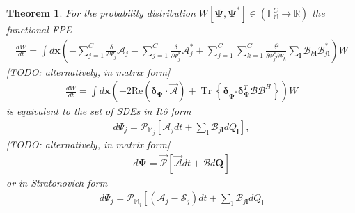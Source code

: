 \documentclass[12pt,aip,jmp,amssymb,amsmath]{revtex4-1}
\newtheorem{theorem}{Theorem}
\begin{document}
\begin{theorem}
\label{thm:app-fpe:fpe-sde-func}
    For the probability distribution $W[\boldsymbol{\Psi}, \boldsymbol{\Psi}^*] \in (\mathbb{F}_{\mathbb{M}}^C \rightarrow \mathbb{R})$ the functional FPE
    \begin{equation*}\begin{split}
        \frac{dW}{dt}
        = \int d\boldsymbol{x} \left(
            - \sum_{j=1}^C \frac{\delta}{\delta \Psi_j} \mathcal{A}_j
            - \sum_{j=1}^C \frac{\delta}{\delta \Psi_j^*} \mathcal{A}_j^*
            + \sum_{j=1}^C \sum_{k=1}^C \frac{\delta^2}{\delta \Psi_j^* \delta \Psi_k}
                \sum_{\boldsymbol{l}} \mathcal{B}_{k \boldsymbol{l}} \mathcal{B}_{j \boldsymbol{l}}^*
        \right) W
    \end{split}\end{equation*}
    [TODO: alternatively, in matrix form]
    \begin{equation*}\begin{split}
        \frac{dW}{dt}
        = \int d\boldsymbol{x} \left(
            - 2 \mathrm{Re} \left( \boldsymbol{\delta}_{\boldsymbol{\Psi}} \cdot \vec{\mathcal{A}} \right)
            + \operatorname{Tr} \left\{ \boldsymbol{\delta}_{\boldsymbol{\Psi}^*} \boldsymbol{\delta}_{\boldsymbol{\Psi}}^T \mathcal{B} \mathcal{B}^H \right\}
        \right) W
    \end{split}\end{equation*}
    is equivalent to the set of SDEs in It\^{o} form
    \begin{equation*}\begin{split}
        d\Psi_j = \mathcal{P}_{\mathbb{M}_j} \left[
            \mathcal{A}_j dt + \sum_{\boldsymbol{l}} \mathcal{B}_{j \boldsymbol{l}} dQ_{\boldsymbol{l}}
        \right],
    \end{split}\end{equation*}
    [TODO: alternatively, in matrix form]
    \begin{equation*}\begin{split}
        d\boldsymbol{\Psi} = \vec{\mathcal{P}} \left[
            \vec{\mathcal{A}} dt + \mathcal{B} d\boldsymbol{Q}
        \right]
    \end{split}\end{equation*}
    or in Stratonovich form
    \begin{equation*}\begin{split}
        d\Psi_j = \mathcal{P}_{\mathbb{M}_j} \left[
            (\mathcal{A}_j - \mathcal{S}_j) dt + \sum_{\boldsymbol{l}} \mathcal{B}_{j \boldsymbol{l}} dQ_{\boldsymbol{l}}

\end{split}
\end{equation*}
\end{theorem}
\end{document}
